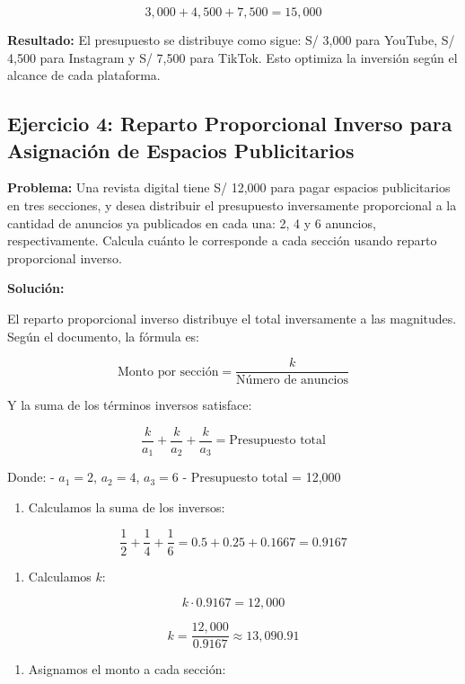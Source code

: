 \documentclass[
  stu,
  floatsintext,
  longtable,
  a4paper,
  nolmodern,
  notxfonts,
  notimes,
  colorlinks=true,linkcolor=blue,citecolor=blue,urlcolor=blue]{apa7}
\providecommand{\tightlist}{%
  \setlength{\itemsep}{0pt}\setlength{\parskip}{0pt}}
\begin{document}
\[
3,000 + 4,500 + 7,500 = 15,000
\]

\textbf{Resultado:} El presupuesto se distribuye como sigue: S/ 3,000
para YouTube, S/ 4,500 para Instagram y S/ 7,500 para TikTok. Esto
optimiza la inversión según el alcance de cada plataforma.

\subsection{Ejercicio 4: Reparto Proporcional Inverso para Asignación de
Espacios
Publicitarios}\label{ejercicio-4-reparto-proporcional-inverso-para-asignaciuxf3n-de-espacios-publicitarios}

\textbf{Problema:} Una revista digital tiene S/ 12,000 para pagar
espacios publicitarios en tres secciones, y desea distribuir el
presupuesto inversamente proporcional a la cantidad de anuncios ya
publicados en cada una: 2, 4 y 6 anuncios, respectivamente. Calcula
cuánto le corresponde a cada sección usando reparto proporcional
inverso.

\textbf{Solución:}

El reparto proporcional inverso distribuye el total inversamente a las
magnitudes. Según el documento, la fórmula es:

\[
\text{Monto por sección} = \frac{k}{\text{Número de anuncios}}
\]

Y la suma de los términos inversos satisface:

\[
\frac{k}{a_1} + \frac{k}{a_2} + \frac{k}{a_3} = \text{Presupuesto total}
\]

Donde: - \(a_1 = 2\), \(a_2 = 4\), \(a_3 = 6\) - Presupuesto total =
12,000

\begin{enumerate}
\def\labelenumi{\arabic{enumi}.}
\tightlist
\item
  Calculamos la suma de los inversos:
\end{enumerate}

\[
\frac{1}{2} + \frac{1}{4} + \frac{1}{6} = 0.5 + 0.25 + 0.1667 = 0.9167
\]

\begin{enumerate}
\def\labelenumi{\arabic{enumi}.}
\setcounter{enumi}{1}
\tightlist
\item
  Calculamos \(k\):
\end{enumerate}

\[
k \cdot 0.9167 = 12,000
\]

\[
k = \frac{12,000}{0.9167} \approx 13,090.91
\]

\begin{enumerate}
\def\labelenumi{\arabic{enumi}.}
\setcounter{enumi}{2}
\tightlist
\item
  Asignamos el monto a cada sección:
\end{enumerate}
\end{document}
